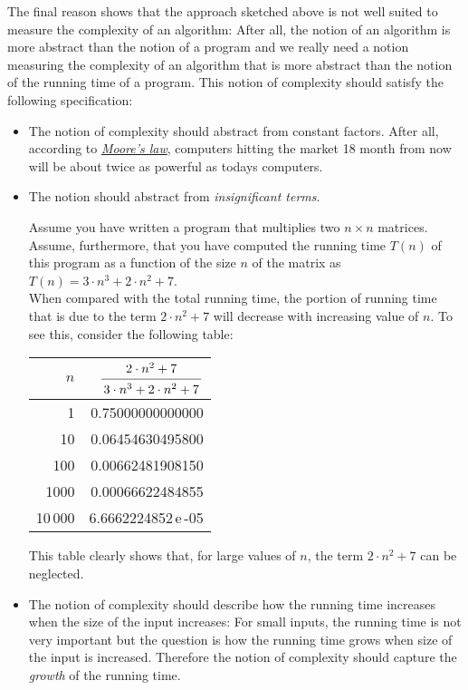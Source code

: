 The final reason shows that the approach sketched above is not well suited to measure the complexity of
an algorithm: After all, the notion of an algorithm is more abstract than the notion of a program
and we really need a notion measuring the complexity of an algorithm that is more abstract than the
notion of the running time of a program.  This notion of complexity should satisfy the following
specification: 
\begin{itemize}
\item The notion of complexity should abstract from constant factors.  After all, according to 
      \href{http://en.wikipedia.org/wiki/Moore's_law}{\emph{Moore's law}}, 
      computers hitting the market 18 month from now will be about twice as powerful as todays computers.

\item The notion should abstract from \emph{insignificant terms}.

      Assume you have written a program that  multiplies two $n \times n$ matrices.  Assume,
      furthermore, that you have computed the running time $T(n)$ of this program as a function 
      of the size $n$ of the matrix as
      \\[0.2cm]
      \hspace*{1.3cm} $T(n) = 3 \cdot n^3 + 2 \cdot n^2 + 7$. 
      \\[0.2cm]
      When compared with the total running time, the portion of running time that is due to the term 
      $2\cdot n^2 + 7$ will decrease with increasing value of $n$.  To see this, consider the
      following table:
      \\[0.3cm]
      \hspace*{1.3cm} 
      \begin{tabular}{|r|r|}
        \hline
        $n$  & \rule{0pt}{16pt} $\bruch{2 \cdot n^2 + 7}{3 \cdot n^3 + 2 \cdot n^2 + 7}$ \\[0.3cm]
        \hline
        \hline
        1       &  0.75000000000000  \\
        10      &  0.06454630495800  \\
        100     &  0.00662481908150  \\
        1000    &  0.00066622484855  \\
        10\,000 &  6.6662224852\,e\,-05  \\
       \hline
      \end{tabular}

      This table clearly shows that, for large values of $n$, the term $2 \cdot n^2 + 7$ can be
      neglected. 
\item The notion of complexity should describe how the running time increases
      when the size of the input increases:  For small inputs, the running time is not very
      important but the question is how the running time grows when  size of the input is increased. 
      Therefore the notion of complexity should capture the \emph{growth} of the running time.
\end{itemize}
